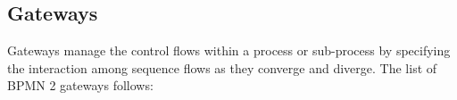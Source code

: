 \subsection{Gateways}
Gateways manage the control flows within a process or sub-process by specifying the interaction among sequence flows as they converge and diverge. The list of BPMN 2 gateways follows:

